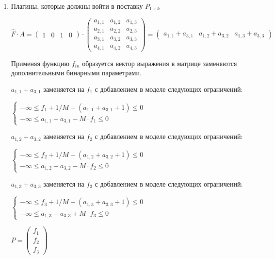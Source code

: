 \begin{enumerate}
  \item Плагины, которые должны войти в поставку $P_{1 \times k}$ 
  \begin{center}
    $
      \hat{F} \cdot A 
      = 
      \begin{pmatrix}
        1 & 0 & 1 & 0
      \end{pmatrix}
      \cdot
      \begin{pmatrix}
        a_{1, 1} & a_{1, 2} & a_{1, 3} \\
        a_{2, 1} & a_{2, 2} & a_{2, 3} \\
        a_{3, 1} & a_{3, 2} & a_{3, 3} \\
        a_{4, 1} & a_{4, 2} & a_{4, 3}
      \end{pmatrix}
      =
      \begin{pmatrix}
        a_{1, 1} + a_{3, 1} & 
        a_{1, 2} + a_{3, 2} & 
        a_{1, 3} + a_{3, 3} 
      \end{pmatrix}
    $
  \end{center}

  Применяя функцию $f_{in}$ образуется вектор выражения в матрице заменяются дополнительными бинарными параметрами.
  
  $a_{1, 1} + a_{3, 1}$ заменяется на $f_{1}$ с добавлением в моделе следующих ограничений:
  \begin{center}
    $
      \begin{cases}
        -\infty \le f_{1} + 1 / M - (a_{1,1} + a_{3,1} + 1) \le 0 \\ %
        -\infty \le a_{1,1} + a_{3,1} - M \cdot f_{1} \le 0 %
      \end{cases}
    $
  \end{center}

  $a_{1, 2} + a_{3, 2}$ заменяется на $f_{2}$ с добавлением в моделе следующих ограничений:
  \begin{center}
    $
      \begin{cases}
        -\infty \le f_{2} + 1 / M - (a_{1,2} + a_{3,2} + 1) \le 0 \\ %
        -\infty \le a_{1,2} + a_{3,2} - M \cdot f_{2} \le 0 %
      \end{cases}
    $
  \end{center}

  $a_{1, 3} + a_{3, 3}$ заменяется на $f_{3}$ с добавлением в моделе следующих ограничений:
  \begin{center}
    $
      \begin{cases}
        -\infty \le f_{3} + 1 / M - (a_{1,3} + a_{3,3} + 1) \le 0 \\ %
        -\infty \le a_{1,3} + a_{3,3} + M \cdot f_{3} \le 0 %
      \end{cases}
    $
  \end{center}
  \begin{center}
    $
      \dot{P} = \begin{pmatrix}
        f_{1} \\ 
        f_{2} \\
        f_{3} 
      \end{pmatrix}
    $
  \end{center}


\end{enumerate}
